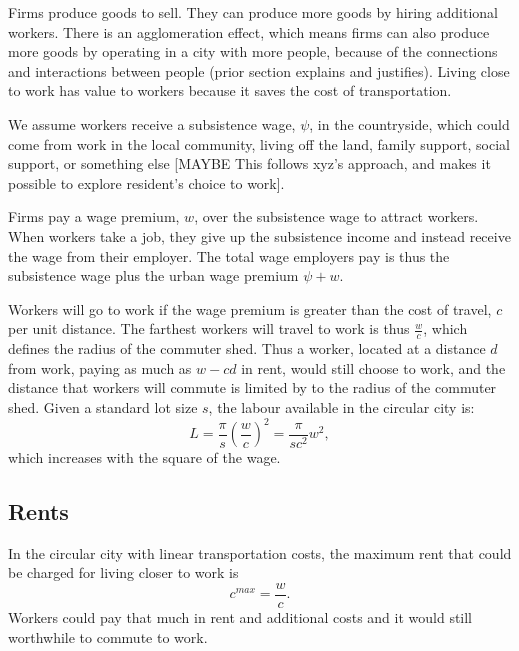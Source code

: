 Firms produce goods to sell. They can produce more goods by hiring additional workers. 
There is an agglomeration effect, which means firms can also produce more goods by operating in a city with more people, because of the connections and interactions between people (prior section explains and justifies). 
Living close to work has value to workers because it saves the cost of transportation. 

We assume workers receive a subsistence wage, $\psi$, in the countryside, which could come from work in the local community, living off the land, family support, social support, or something else [MAYBE This follows xyz's approach, and makes it possible to explore resident's choice to work]. 

Firms pay a wage premium, $w$, over the subsistence wage to attract workers. 
When workers take a job, they give up the subsistence income and instead receive the wage from their employer. 
The total wage employers pay is thus the subsistence wage plus the urban wage premium  $\psi + w$.


Workers will go to work if the wage premium is greater than the cost of travel, ${c}$ per unit distance. 
The farthest workers will travel to work is thus $\frac{w}{{c}}$, which defines the radius of the commuter shed. Thus a worker, located at a distance $d$ from work, paying as much as $w-{c} d$ in rent, would still choose to work, and the distance that workers will commute is limited by to the radius of the commuter shed. Given a standard lot size $s$, the labour available in the circular city is:
\begin{equation}
 L = \frac{\pi}{s} \left(\frac{w}{{c}}\right)^2
   = \frac{\pi}{s {c}^2} w^2,
\label{eqn-labour-supply1}
\end{equation}
which increases with the square of the wage.




\subsection{Rents}
In the circular city with linear transportation costs, the maximum rent that could be charged for living closer to work is
 \[c^{max}= \frac{w}{{c}}.\]  
 Workers could pay that much in rent and additional costs and it would still worthwhile to commute to work. 

